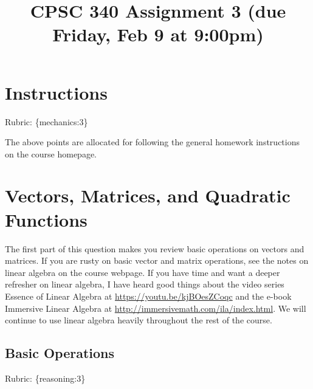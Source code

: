 \documentclass{article}
\def\rubric#1{\gre{Rubric: \{#1\}}}{}
\def\gre#1{{\color{gre}#1}}
\begin{document}
\title{CPSC 340 Assignment 3 (due Friday, Feb 9 at 9:00pm)}
\date{}
\maketitle

\vspace{-7em}

\section*{Instructions}
\rubric{mechanics:3}

The above points are allocated for following the general homework instructions on the course homepage.

\tableofcontents

\section{Vectors, Matrices, and Quadratic Functions}

The first part of this question makes you review basic operations on vectors and matrices. 
If you are rusty on basic vector and matrix operations, see the notes on linear algebra on the course webpage. 
If you have time and want a deeper refresher on linear algebra, I have heard good things about
the video series Essence of Linear Algebra at \url{https://youtu.be/kjBOesZCoqc} and the e-book
Immersive Linear Algebra at \url{http://immersivemath.com/ila/index.html}. We will continue to use linear algebra
heavily throughout the rest of the course.

\subsection{Basic Operations}
\rubric{reasoning:3}
\end{document}

